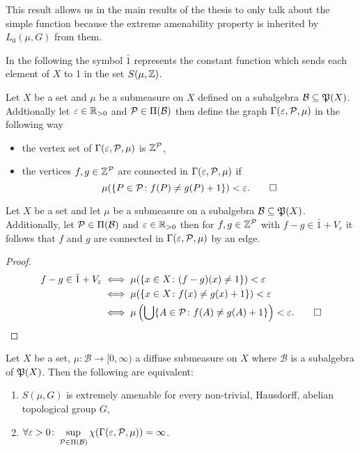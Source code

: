 This result allows us in the main results of the thesis to only talk about the simple function because the extreme amenability property is inherited by $L_0(\mu, G)$ from them.

In the following the symbol $\bar{1}$ represents the constant function which sends each element of $X$ to 1 in the set $S(\mu, \Z)$. 

\begin{defin}
  Let $X$ be a set and $\mu$ be a submeasure on $X$ defined on a subalgebra $\mathcal{B} \subseteq \PowS(X)$. Addtionally let $\varepsilon \in \R_{>0}$ and $\P \in \Pi(\mathcal{B})$ then define the graph $\Gamma(\varepsilon, \P, \mu)$ in the following way
  \begin{itemize}
    \item the vertex set of $\Gamma(\varepsilon, \P, \mu)$ is $\Z^\P$,
    \item the vertices $f, g \in \Z^\P$ are connected in $\Gamma(\varepsilon, \P, \mu)$ if \[\mu(\{P \in \P\colon f(P) \neq g(P) + 1\}) < \varepsilon.\qedhere\]
  \end{itemize}
\end{defin}

\begin{lemma}\label{lem:1}
  Let $X$ be a set and let $\mu$ be a submeasure on a subalgebra $\mathcal{B} \subseteq \PowS(X)$. Additionally, let $\P \in \Pi(\mathcal{B})$ and $\varepsilon \in \R_{>0}$ then for $f,g \in \Z^\P$ with $f - g \in \bar{1} + V_\varepsilon$ it follows that $f$ and $g$ are connected in $\Gamma(\varepsilon, \P, \mu)$ by an edge.
\end{lemma}

\begin{proof}
  \begin{align*}
    f - g \in \bar{1} + V_\varepsilon   &\iff \mu(\{x \in X\colon (f-g)(x) \neq 1\}) < \varepsilon \\
                                      &\iff \mu(\{x \in X\colon f(x) \neq g(x) + 1\}) < \varepsilon \\
                                      &\iff \mu\left(\bigcup \{A \in \P \colon f(A) \neq g(A) + 1\}\right) < \varepsilon.\qedhere
  \end{align*}
\end{proof}

\begin{thm}\label{thm:colve}
  Let $X$ be a set, $\mu\colon \mathcal{B} \to [0, \infty)$ a diffuse submeasure on $X$ where $\mathcal{B}$ is a subalgebra of $\PowS(X)$. Then the following are equivalent:
  \begin{enumerate}
    \item $S(\mu, G)$ is extremely amenable for every non-trivial, Hausdorff, abelian topological group $G$,
    \item $\forall \varepsilon > 0\colon \sup\limits_{\P \in \Pi(\mathcal{B})}\chi(\Gamma(\varepsilon, \mathcal{P}, \mu)) = \infty$.
  \end{enumerate}
\end{thm}

